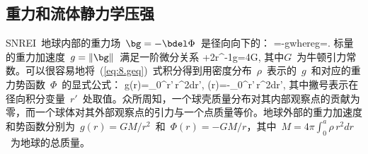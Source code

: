 \subsection{重力和流体静力学压强}
%
%
%

SNREI~地球内部的重力场~$\bg=-\bdel\Phi$~是径向向下的：
\eq
\bg=-g\brh\quad\mbox{where}\quad g=\dot{\Phi}.
\label{eq:8.g}
\en
标量的重力加速度~$g=\|\bg\|$~满足一阶微分关系
\eq
\dg+2r^{-1}g=4\pi G\rho,
\label{eq:8.geq}
\en
其中$G$~为牛顿引力常数。可以很容易地将~(\ref{eq:8.geq})~式积分得到用密度分布~$\rho$~表示的~$g$~和对应的重力势函数~$\Phi$~的显式公式：
\eq
g(r)=\int_0^r\rho'\,r^{\prime\hspace{0.3 mm}2}dr',
\qquad
\Phi(r)=-\int_0^r\rho'\,r^{\prime\hspace{0.3 mm}2}dr',
\label{eq:8.gr}
\en
其中撇号表示在径向积分变量~$r'$~处取值。众所周知，一个球壳质量分布对其内部观察点的贡献为零，而一个球体对其外部观察点的引力与一个点质量等价。地球外部的重力加速度和势函数分别为~$g(r)=GM/r^2$~和~$\Phi(r)=-GM/r$，其中~$M=4\pi\int_0^a\rho\,r^2dr$~为地球的总质量。

